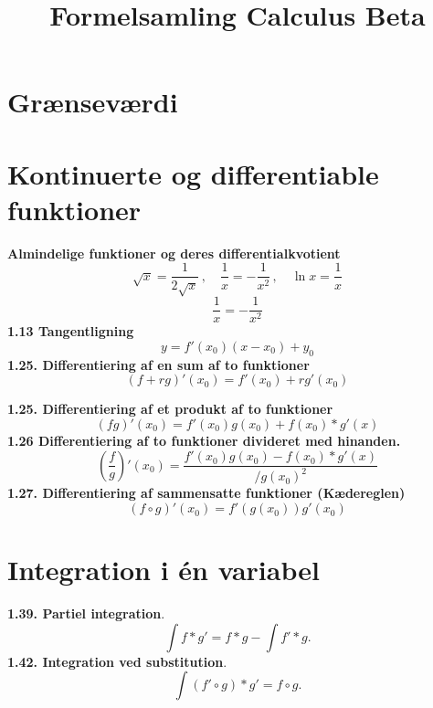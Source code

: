 


	
	\title{Formelsamling Calculus Beta}
	\maketitle
	
	
	\section{Grænseværdi}
	
	\section{Kontinuerte og differentiable funktioner}
	
	\textbf{Almindelige funktioner og deres differentialkvotient}
	\[
	\sqrt{x} = \frac{1}{2\sqrt{x}}\,,\quad
	\frac{1}{x} = -\frac{1}{x^2}\,,\quad
	\ln{x} = \frac{1}{x}
	\]
	\[
	\frac{1}{x} = -\frac{1}{x^2}
	\]
	\textbf{1.13 Tangentligning}
	\[
	y = f'(x_0)(x-x_0)+y_0
	\]
	\textbf{1.25. Differentiering af en sum af to funktioner}
	\[
	(f+rg)'(x_0) = f'(x_0)+rg'(x_0)
	\]
	
	\textbf{1.25. Differentiering af et produkt af to funktioner}
	\[
	(fg)'(x_0) = f'(x_0)g(x_0)+f(x_0)*g'(x)
	\]
	\textbf{1.26 Differentiering af to funktioner divideret med hinanden.}
	\[
	\left(\frac{f}{g}\right)'(x_0) = \frac{f'(x_0)g(x_0)-f(x_0)*g'(x)}{/g(x_0)^2}
	\]
	\textbf{1.27. Differentiering af sammensatte funktioner (Kædereglen)}
	\[
	(f\circ g)'(x_0) = f'(g(x_0))g'(x_0)
	\]
	
	
	\section{Integration i én variabel}
	\textbf{1.39. Partiel integration}.\[
	\int f*g'=f*g-\int f'*g.
	\]
	\textbf{1.42. Integration ved substitution}.
	\[
	\int (f'\circ g)*g'=f\circ g.
	\]
	
